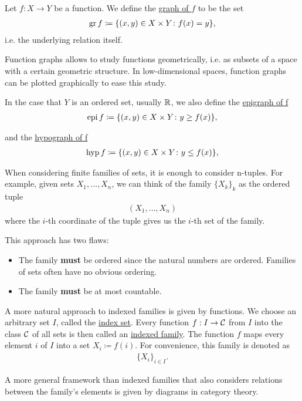 \begin{definition}\label{def:function_graphs}
  Let $f: X \to Y$ be a function. We define the \ul{graph of $f$} to be the set
  \begin{align*}
    \operatorname{gr} f \coloneqq \{ (x, y) \in X \times Y \colon f(x) = y \},
  \end{align*}
  i.e. the underlying relation itself.

  Function graphs allows to study functions geometrically, i.e. as subsets of a space with a certain geometric structure. In low-dimensional spaces, function graphs can be plotted graphically to ease this study.

  In the case that $Y$ is an ordered set, usually $\mathbb R$, we also define the \ul{epigraph of f}
  \begin{align*}
    \operatorname{epi} f \coloneqq \{ (x, y) \in X \times Y \colon y \geq f(x) \},
  \end{align*}

  and the \ul{hypograph of f}
  \begin{align*}
    \operatorname{hyp} f \coloneqq \{ (x, y) \in X \times Y \colon y \leq f(x) \},
  \end{align*}
\end{definition}

\begin{definition}\label{def:indexed_family}
  When considering finite families of sets, it is enough to consider n-tuples. For example, given sets $X_1, \ldots, X_n$, we can think of the family $\{ X_k \}_k$ as the ordered tuple
  \begin{align*}
    (X_1, \ldots, X_n)
  \end{align*}
  where the $i$-th coordinate of the tuple gives us the $i$-th set of the family.

  This approach has two flaws:
  \begin{itemize}
    \item The family \textbf{must} be ordered since the natural numbers are ordered. Families of sets often have no obvious ordering.
    \item The family \textbf{must} be at most countable.
  \end{itemize}

  A more natural approach to indexed families is given by functions. We choose an arbitrary set $I$, called the \ul{index set}. Every function $f: I \to \mathcal C$ from $I$ into the class $\cal C$ of all sets is then called an \ul{indexed family}. The function $f$ maps every element $i$ of $I$ into a set $X_i \coloneqq f(i)$. For convenience, this family is denoted as
  \begin{align*}
    \{ X_i \}_{i \in I}.
  \end{align*}

  A more general framework than indexed families that also considers relations between the family's elements is given by diagrams in category theory.
\end{definition}

